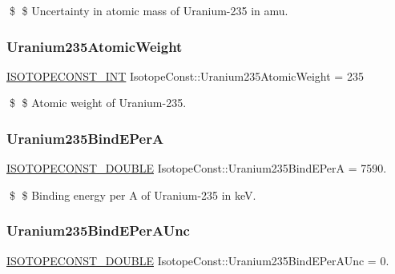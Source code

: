 \$ \$ Uncertainty in atomic mass of Uranium-\/235 in amu. \mbox{\label{group___isotope_const-_uranium-_u235_ga6372e0f0607cfd500265f2aac2bb535c}} 
\subsubsection{\texorpdfstring{Uranium235\+Atomic\+Weight}{Uranium235AtomicWeight}}
{\footnotesize\ttfamily \mbox{\hyperlink{group___isotope_const-_macros_ga5f18360b3e99483a35c32d789e62621c}{I\+S\+O\+T\+O\+P\+E\+C\+O\+N\+S\+T\+\_\+\+I\+NT}} Isotope\+Const\+::\+Uranium235\+Atomic\+Weight = 235}

\$ \$ Atomic weight of Uranium-\/235. \mbox{\label{group___isotope_const-_uranium-_u235_ga2f1bc63479f2f6b2a2dbbc5ebe8967ed}} 
\subsubsection{\texorpdfstring{Uranium235\+Bind\+E\+PerA}{Uranium235BindEPerA}}
{\footnotesize\ttfamily \mbox{\hyperlink{group___isotope_const-_macros_ga8f45a7272ce02c0b4c65c44636ed719a}{I\+S\+O\+T\+O\+P\+E\+C\+O\+N\+S\+T\+\_\+\+D\+O\+U\+B\+LE}} Isotope\+Const\+::\+Uranium235\+Bind\+E\+PerA = 7590.}

\$ \$ Binding energy per A of Uranium-\/235 in keV. \mbox{\label{group___isotope_const-_uranium-_u235_ga5bc7905b197fdab8a391de1cd2822480}} 
\subsubsection{\texorpdfstring{Uranium235\+Bind\+E\+Per\+A\+Unc}{Uranium235BindEPerAUnc}}
{\footnotesize\ttfamily \mbox{\hyperlink{group___isotope_const-_macros_ga8f45a7272ce02c0b4c65c44636ed719a}{I\+S\+O\+T\+O\+P\+E\+C\+O\+N\+S\+T\+\_\+\+D\+O\+U\+B\+LE}} Isotope\+Const\+::\+Uranium235\+Bind\+E\+Per\+A\+Unc = 0.}


